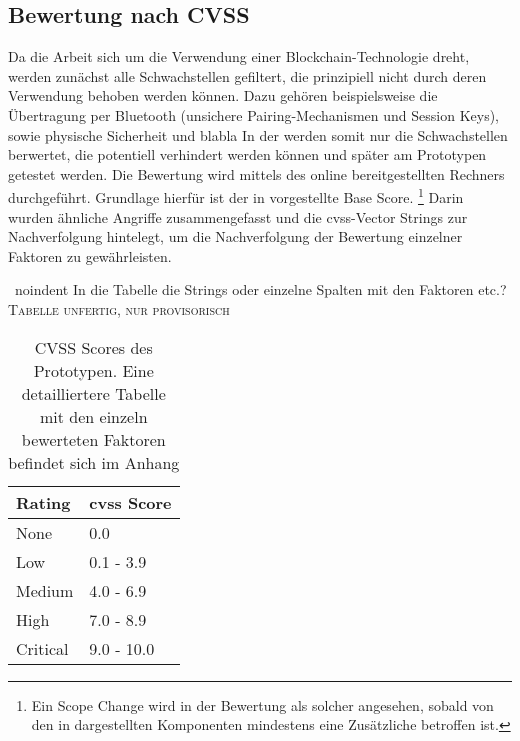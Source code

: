 \subsection{Bewertung nach CVSS}
\label{sec:analysis_cvss}
    Da die Arbeit sich um die Verwendung einer Blockchain-Technologie dreht, werden zunächst alle Schwachstellen gefiltert, die prinzipiell nicht durch deren Verwendung behoben werden können.
    Dazu gehören beispielsweise die Übertragung per Bluetooth (unsichere Pairing-Mechanismen und Session Keys), sowie physische Sicherheit und blabla
    In der  werden somit nur die Schwachstellen berwertet, die potentiell verhindert werden können und später am Prototypen getestet werden.
    Die Bewertung wird mittels des online bereitgestellten Rechners\cite{CvssCalc} durchgeführt.
	Grundlage hierfür ist der in  vorgestellte Base Score.
	\footnote{Ein Scope Change wird in der Bewertung als solcher angesehen, sobald von den in  dargestellten Komponenten mindestens eine Zusätzliche betroffen ist.}
	Darin wurden ähnliche Angriffe zusammengefasst und die \gls{cvss}-Vector Strings zur Nachverfolgung hintelegt, um die Nachverfolgung der Bewertung einzelner Faktoren zu gewährleisten.
	
	\
	noindent In die Tabelle die Strings oder einzelne Spalten mit den Faktoren etc.?\\
	{\large\textsc{Tabelle unfertig, nur provisorisch}}
    \begin{table}[H]
        \centering
        \begin{tabular}{|m{}|m{}|}
        \hline
        \textbf{Rating}   & \textbf{\gls{cvss} Score}   \\ \hline
        \rowcolor{light-gray}
        None              & 0.0                         \\ \hline
        Low               & 0.1 - 3.9                   \\ \hline
        \rowcolor{light-gray}
        Medium            & 4.0 - 6.9                   \\ \hline
        High              & 7.0 - 8.9                   \\ \hline
        \rowcolor{light-gray}
        Critical          & 9.0 - 10.0                  \\ \hline
        \end{tabular}
        \caption[CVSS Scores des Prototypen]{CVSS Scores des Prototypen. Eine detailliertere Tabelle mit den einzeln bewerteten Faktoren befindet sich im Anhang}
        \label{tab:vulns_cvss_short}
    \end{table}
